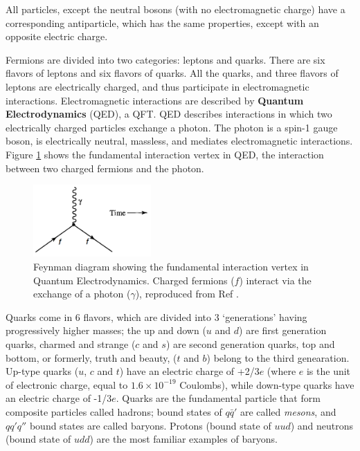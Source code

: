 \documentclass[11pt,a4paper,openright,twoside]{report}
\begin{document}
All particles, except the neutral bosons (with no electromagnetic charge) have a corresponding antiparticle, which has the same properties, except with an opposite electric charge.

Fermions are divided into two categories: leptons and quarks. There are six flavors of leptons and six flavors of quarks. All the quarks, and three flavors of leptons are electrically charged, and thus participate in electromagnetic interactions. Electromagnetic interactions are described by \textbf{Quantum Electrodynamics} (QED)\cite{QED}, a QFT. QED describes interactions in which two electrically charged particles exchange a photon. The photon is a spin-1 gauge boson, is electrically neutral, massless, and mediates electromagnetic interactions. Figure \ref{fig:qed_fund_vertex} shows the fundamental interaction vertex in QED, the interaction between two charged fermions and the photon.

\begin{figure}[H]
\centering
\includegraphics[width = 0.4\textwidth]{fundamental_vertex_qed.png}
\caption{Feynman diagram showing the fundamental interaction vertex in Quantum Electrodynamics. Charged fermions ($f$) interact via the exchange of a photon ($\gamma$), reproduced from Ref \cite{griff}.}
\label{fig:qed_fund_vertex}
\end{figure}

Quarks come in 6 flavors, which are divided into 3 `generations' having progressively higher masses; the up and down ($u$ and $d$) are first generation quarks, charmed and strange ($c$ and $s$) are second generation quarks, top and bottom, or formerly, truth and beauty, ($t$ and $b$) belong to the third genearation. Up-type quarks ($u$, $c$ and $t$) have an electric charge of +2/3$e$ (where $e$ is the unit of electronic charge, equal to $1.6\times 10^{-19}$ Coulombs), while down-type quarks have an electric charge of -1/3$e$. Quarks are the fundamental particle that form composite particles called hadrons; bound states of $q\bar{q}'$ are called \textit{mesons}, and $qq'q''$ bound states are called baryons. Protons (bound state of $uud$) and neutrons (bound state of $udd$) are the most familiar examples of baryons.
\end{document}
